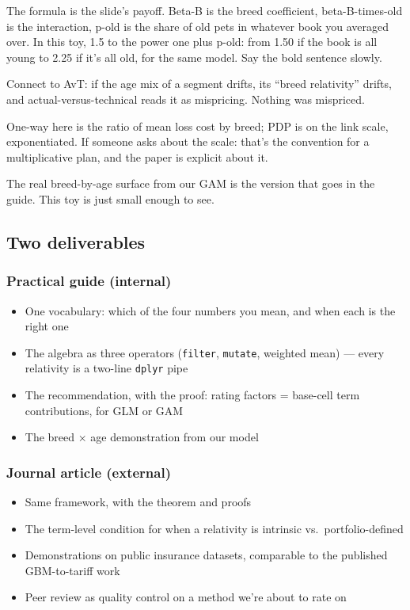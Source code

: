 \documentclass[
  letterpaper,
  DIV=11,
  numbers=noendperiod]{scrartcl}
\providecommand{\tightlist}{%
  \setlength{\itemsep}{0pt}\setlength{\parskip}{0pt}}
\begin{document}
The formula is the slide's payoff. Beta-B is the breed coefficient,
beta-B-times-old is the interaction, p-old is the share of old pets in
whatever book you averaged over. In this toy, 1.5 to the power one plus
p-old: from 1.50 if the book is all young to 2.25 if it's all old, for
the same model. Say the bold sentence slowly.

Connect to AvT: if the age mix of a segment drifts, its ``breed
relativity'' drifts, and actual-versus-technical reads it as mispricing.
Nothing was mispriced.

One-way here is the ratio of mean loss cost by breed; PDP is on the link
scale, exponentiated. If someone asks about the scale: that's the
convention for a multiplicative plan, and the paper is explicit about
it.

The real breed-by-age surface from our GAM is the version that goes in
the guide. This toy is just small enough to see.

\subsection{Two deliverables}\label{deliverables}

\subsubsection{Practical guide
(internal)}\label{practical-guide-internal}

\begin{itemize}
\tightlist
\item
  One vocabulary: which of the four numbers you mean, and when each is
  the right one
\item
  The algebra as three operators (\texttt{filter}, \texttt{mutate},
  weighted mean) --- every relativity is a two-line \texttt{dplyr} pipe
\item
  The recommendation, with the proof: rating factors = base-cell term
  contributions, for GLM or GAM
\item
  The breed \(\times\) age demonstration from our model
\end{itemize}

\subsubsection{Journal article
(external)}\label{journal-article-external}

\begin{itemize}
\tightlist
\item
  Same framework, with the theorem and proofs
\item
  The term-level condition for when a relativity is intrinsic
  vs.~portfolio-defined
\item
  Demonstrations on public insurance datasets, comparable to the
  published GBM-to-tariff work
\item
  Peer review as quality control on a method we're about to rate on
\end{itemize}
\end{document}
